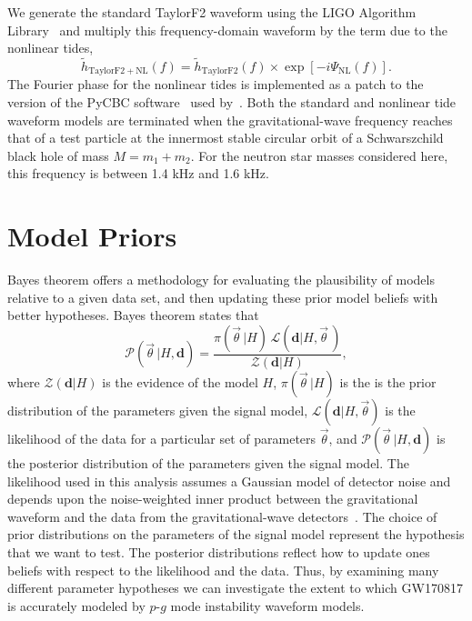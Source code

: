 We generate the standard TaylorF2 waveform using the LIGO Algorithm Library~\citep{lal} and multiply this frequency-domain waveform by the term due to the nonlinear tides,
\begin{equation}
\tilde{h}_\mathrm{TaylorF2+NL}(f) = \tilde{h}_\mathrm{TaylorF2}(f) \times \exp[-i \Psi_\mathrm{NL}(f) ].
\end{equation}
The Fourier phase for the nonlinear tides is implemented as a patch to the version of the PyCBC software~\citep{alex_nitz_2018_1208115} used by~\cite{de2018tidal}. Both the standard and nonlinear tide waveform models are terminated when the gravitational-wave frequency reaches that of a test particle at the innermost stable circular orbit of a Schwarszchild black hole of mass $M = m_1 + m_2$. For the neutron star masses considered here, this frequency is between 1.4 kHz and 1.6 kHz.

\section{Model Priors} \label{sec:priors}
Bayes theorem offers a methodology for evaluating the plausibility of models relative to a given data set, and then updating these prior model beliefs with better hypotheses. Bayes theorem states that
\begin{equation}
\mathcal{P}\left(\vec{\theta}\,| H, \mathbf{d}\right) = \frac{\pi\left(\vec{\theta}\,|H\right) \, \mathcal{L}\left(\mathbf{d}|H, \vec{\theta}\,\right)}{\mathcal{Z}\left(\mathbf{d}|H\right)},
\label{eq:bayestheorem}
\end{equation}
where $\mathcal{Z} \left(\mathbf{d}|H \right)$ is the evidence of the model $H$, $\pi \left(\vec{\theta}\,|H\right)$ is the is the prior distribution of the parameters given the signal model, $\mathcal{L}\left(\mathbf{d}|H, \vec{\theta}\right)$ is the likelihood of the data for a particular set of parameters $\vec{\theta}$, and $\mathcal{P}\left( \vec{\theta}\,|H, \mathbf{d}\right)$ is the posterior distribution of the parameters given the signal model. The likelihood used in this analysis assumes a Gaussian model of detector noise and depends upon the noise-weighted inner product between the gravitational waveform and the data from the gravitational-wave detectors~\citep{Finn:2000hj,Rover:2006bb}. The choice of prior distributions on the parameters of the signal model represent the hypothesis that we want to test. The posterior distributions reflect how to update ones beliefs with respect to the likelihood and the data. Thus, by examining many different parameter hypotheses we can investigate the extent to which GW170817 is accurately modeled by $p$-$g$ mode instability waveform models.

